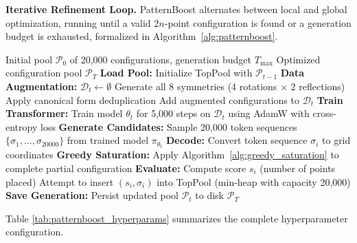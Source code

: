 \documentclass{article}
\theoremstyle{plain}
\theoremstyle{definition}
\theoremstyle{remark}
\begin{document}
\textbf{Iterative Refinement Loop.} PatternBoost alternates between local and global optimization, running until a valid $2n$-point configuration is found or a generation budget is exhausted, formalized in Algorithm~\ref{alg:patternboost}.
\begin{algorithm}[htbp]
\caption{PatternBoost Iterative Refinement}
\label{alg:patternboost}
\begin{algorithmic}[1]
 Initial pool $\mathcal{P}_0$ of 20,000 configurations, generation budget $T_{\max}$
 Optimized configuration pool $\mathcal{P}_T$
    \STATE \textbf{Load Pool:} Initialize TopPool with $\mathcal{P}_{t-1}$
    \STATE \textbf{Data Augmentation:} $\mathcal{D}_t \gets \emptyset$
        \STATE Generate all 8 symmetries (4 rotations $\times$ 2 reflections)
        \STATE Apply canonical form deduplication
        \STATE Add augmented configurations to $\mathcal{D}_t$
    \ENDFOR
    \STATE \textbf{Train Transformer:} Train model $\theta_t$ for 5,000 steps on $\mathcal{D}_t$ using AdamW \cite{Loshchilov2019} with cross-entropy loss
    \STATE \textbf{Generate Candidates:} Sample 20,000 token sequences $\{\sigma_1, \ldots, \sigma_{20000}\}$ from trained model $\pi_{\theta_t}$
        \STATE \textbf{Decode:} Convert token sequence $\sigma_i$ to grid coordinates
        \STATE \textbf{Greedy Saturation:} Apply Algorithm~\ref{alg:greedy_saturation} to complete partial configuration
        \STATE \textbf{Evaluate:} Compute score $s_i$ (number of points placed)
        \STATE Attempt to insert $(s_i, \sigma_i)$ into TopPool (min-heap with capacity 20,000)
    \ENDFOR
    \STATE \textbf{Save Generation:} Persist updated pool $\mathcal{P}_t$ to disk
\ENDFOR
{} $\mathcal{P}_T$
\end{algorithmic}
\end{algorithm}

Table \ref{tab:patternboost_hyperparams} summarizes the complete hyperparameter configuration.
\end{document}
